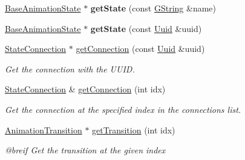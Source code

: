 \begin{Indent}
\begin{DoxyCompactItemize}
\mbox{\hyperlink{classrev_1_1_base_animation_state}{Base\+Animation\+State}} $\ast$ {\bfseries get\+State} (const \mbox{\hyperlink{classrev_1_1_g_string}{G\+String}} \&name)
\item 
\mbox{\label{classrev_1_1_animation_state_machine_a6979279009ce64c743511fe2ca7a9933}} 
\mbox{\hyperlink{classrev_1_1_base_animation_state}{Base\+Animation\+State}} $\ast$ {\bfseries get\+State} (const \mbox{\hyperlink{classrev_1_1_uuid}{Uuid}} \&uuid)
\item 
\mbox{\label{classrev_1_1_animation_state_machine_a421f629fe967b89093dfcf31b2102331}} 
\mbox{\hyperlink{classrev_1_1_state_connection}{State\+Connection}} $\ast$ \mbox{\hyperlink{classrev_1_1_animation_state_machine_a421f629fe967b89093dfcf31b2102331}{get\+Connection}} (const \mbox{\hyperlink{classrev_1_1_uuid}{Uuid}} \&uuid)
\begin{DoxyCompactList}\small\item\em Get the connection with the U\+U\+ID. \end{DoxyCompactList}\item 
\mbox{\label{classrev_1_1_animation_state_machine_a62a9d3592d3ca4700928d3be47b12e3e}} 
\mbox{\hyperlink{classrev_1_1_state_connection}{State\+Connection}} \& \mbox{\hyperlink{classrev_1_1_animation_state_machine_a62a9d3592d3ca4700928d3be47b12e3e}{get\+Connection}} (int idx)
\begin{DoxyCompactList}\small\item\em Get the connection at the specified index in the connections list. \end{DoxyCompactList}\item 
\mbox{\label{classrev_1_1_animation_state_machine_ab3ea2d93b4a31993f8c3f807b7a799b7}} 
\mbox{\hyperlink{classrev_1_1_animation_transition}{Animation\+Transition}} $\ast$ \mbox{\hyperlink{classrev_1_1_animation_state_machine_ab3ea2d93b4a31993f8c3f807b7a799b7}{get\+Transition}} (int idx)
\begin{DoxyCompactList}\small\item\em @breif Get the transition at the given index \end{DoxyCompactList}\item 
\mbox{\label{classrev_1_1_animation_state_machine_a152e7cd729c0ca4733f766a751cc6ee2}} 

\end{DoxyCompactItemize}
\end{Indent}
